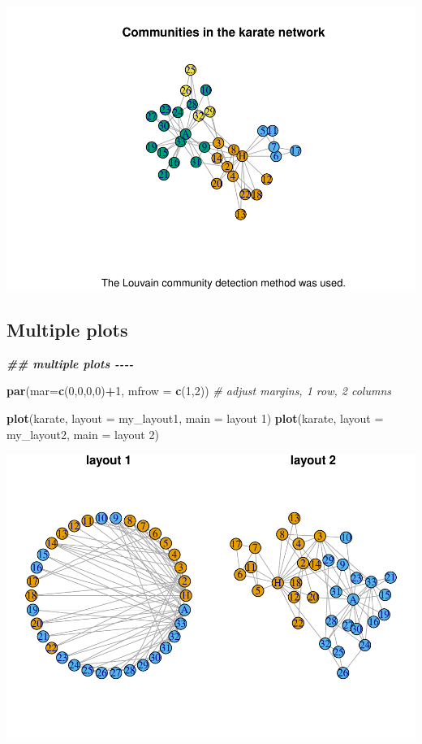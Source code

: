 \documentclass[
]{book}
\newenvironment{Shaded}{\begin{snugshade}}{\end{snugshade}}
\newcommand{\AttributeTok}[1]{\textcolor[rgb]{0.13,0.29,0.53}{#1}}
\newcommand{\CommentTok}[1]{\textcolor[rgb]{0.56,0.35,0.01}{\textit{#1}}}
\newcommand{\DecValTok}[1]{\textcolor[rgb]{0.00,0.00,0.81}{#1}}
\newcommand{\DocumentationTok}[1]{\textcolor[rgb]{0.56,0.35,0.01}{\textbf{\textit{#1}}}}
\newcommand{\FunctionTok}[1]{\textcolor[rgb]{0.13,0.29,0.53}{\textbf{#1}}}
\newcommand{\NormalTok}[1]{#1}
\newcommand{\SpecialCharTok}[1]{\textcolor[rgb]{0.81,0.36,0.00}{\textbf{#1}}}
\newcommand{\StringTok}[1]{\textcolor[rgb]{0.31,0.60,0.02}{#1}}
\begin{document}
\includegraphics{bookdown-demo_files/figure-latex/unnamed-chunk-137-1.pdf}

\subsection{Multiple plots}\label{multiple-plots}

\begin{Shaded}
\begin{Highlighting}[]
\DocumentationTok{\#\# multiple plots {-}{-}{-}{-}}

\FunctionTok{par}\NormalTok{(}\AttributeTok{mar=}\FunctionTok{c}\NormalTok{(}\DecValTok{0}\NormalTok{,}\DecValTok{0}\NormalTok{,}\DecValTok{0}\NormalTok{,}\DecValTok{0}\NormalTok{)}\SpecialCharTok{+}\DecValTok{1}\NormalTok{, }\AttributeTok{mfrow =} \FunctionTok{c}\NormalTok{(}\DecValTok{1}\NormalTok{,}\DecValTok{2}\NormalTok{)) }\CommentTok{\# adjust margins, 1 row, 2 columns  }

\FunctionTok{plot}\NormalTok{(karate, }\AttributeTok{layout =}\NormalTok{ my\_layout1, }\AttributeTok{main =} \StringTok{\textquotesingle{}layout 1\textquotesingle{}}\NormalTok{)}
\FunctionTok{plot}\NormalTok{(karate, }\AttributeTok{layout =}\NormalTok{ my\_layout2, }\AttributeTok{main =} \StringTok{\textquotesingle{}layout 2\textquotesingle{}}\NormalTok{)}
\end{Highlighting}
\end{Shaded}

\includegraphics{bookdown-demo_files/figure-latex/unnamed-chunk-138-1.pdf}
\end{document}
